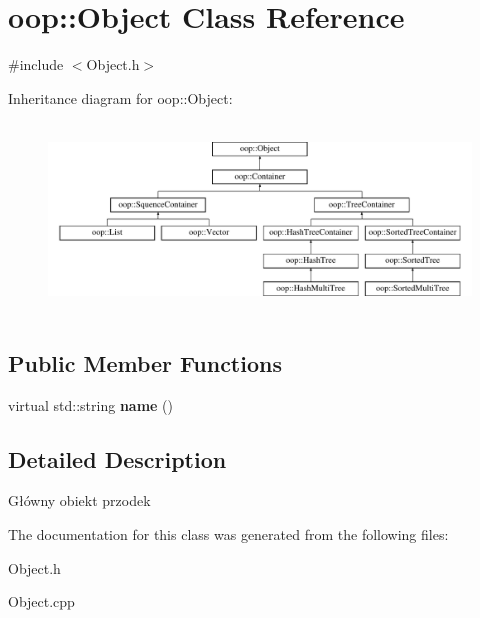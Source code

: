 \hypertarget{classoop_1_1Object}{\section{oop\-:\-:\-Object \-Class \-Reference}
\label{classoop_1_1Object}
}


{\ttfamily \#include $<$\-Object.\-h$>$}

\-Inheritance diagram for oop\-:\-:\-Object\-:\begin{figure}[H]
\begin{center}
\leavevmode
\includegraphics[height=5.090909cm]{classoop_1_1Object}
\end{center}
\end{figure}
\subsection*{\-Public \-Member \-Functions}
\begin{DoxyCompactItemize}
\item 
\hypertarget{classoop_1_1Object_a0120a77777b44355aa7f1d8b4bf43954}{virtual std\-::string {\bfseries name} ()}\label{classoop_1_1Object_a0120a77777b44355aa7f1d8b4bf43954}

\end{DoxyCompactItemize}


\subsection{\-Detailed \-Description}
\-Główny obiekt przodek 

\-The documentation for this class was generated from the following files\-:\begin{DoxyCompactItemize}
\item 
\-Object.\-h\item 
\-Object.\-cpp\end{DoxyCompactItemize}
